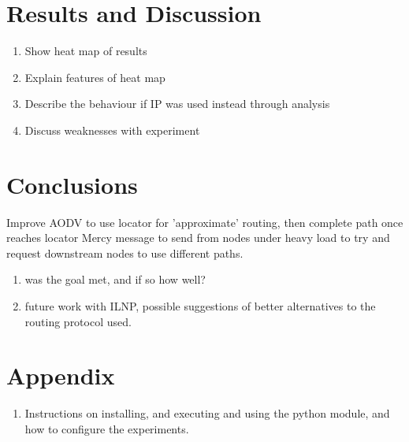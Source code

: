 \documentclass[12pt]{article}
\begin{document}
\pagebreak
\section{Results and Discussion}

\begin{enumerate}
\item Show heat map of results
\item Explain features of heat map
\item Describe the behaviour if IP was used instead through analysis
\item Discuss weaknesses with experiment
\end{enumerate}

\pagebreak
\section{Conclusions}

Improve AODV to use locator for 'approximate' routing, then complete path once reaches locator
Mercy message to send from nodes under heavy load to try and request downstream nodes to use different paths.

\begin{enumerate}	
\item was the goal met, and if so how well?
\item future work with ILNP, possible suggestions of better alternatives to the routing protocol used.
\end{enumerate}

\pagebreak
\section{Appendix}
\begin{enumerate}
\item Instructions on installing, and executing and using the python module, and how to configure the experiments.
\end{enumerate}



\end{document}
